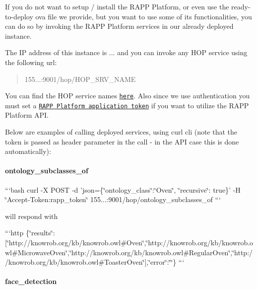 If you do not want to setup / install the R\-A\-P\-P Platform, or even use the ready-\/to-\/deploy ova file we provide, but you want to use some of its functionalities, you can do so by invoking the R\-A\-P\-P Platform services in our already deployed instance.

The I\-P address of this instance is {...} and you can invoke any H\-O\-P service using the following url\-:

\begin{quotation}
155...\-:9001/hop/\-H\-O\-P\-\_\-\-S\-R\-V\-\_\-\-N\-A\-M\-E

\end{quotation}


You can find the H\-O\-P service names \href{https://github.com/rapp-project/rapp-platform/wiki/RAPP-HOP-Web-services}{\tt here}. Also since we use authentication you must set a \href{https://github.com/rapp-project/rapp-api/tree/master/python#authenticationtokens}{\tt R\-A\-P\-P Platform application token} if you want to utilize the R\-A\-P\-P Platform A\-P\-I.

Below are examples of calling deployed services, using {\ttfamily curl} cli (note that the token is passed as header parameter in the call -\/ in the A\-P\-I case this is done automatically)\-:

\paragraph*{ontology\-\_\-subclasses\-\_\-of}

```bash curl -\/\-X P\-O\-S\-T -\/d 'json=\{\char`\"{}ontology\-\_\-class\char`\"{}\-:\char`\"{}\-Oven\char`\"{}, \char`\"{}recursive\char`\"{}\-: true\}' -\/\-H \char`\"{}\-Accept-\/\-Token\-:rapp\-\_\-token\char`\"{} 155...\-:9001/hop/ontology\-\_\-subclasses\-\_\-of ```

will respond with

```http \{\char`\"{}results\char`\"{}\-:\mbox{[}\char`\"{}http\-://knowrob.\-org/kb/knowrob.\-owl\#\-Oven\char`\"{},\char`\"{}http\-://knowrob.\-org/kb/knowrob.\-owl\#\-Microwave\-Oven\char`\"{},\char`\"{}http\-://knowrob.\-org/kb/knowrob.\-owl\#\-Regular\-Oven\char`\"{},\char`\"{}http\-://knowrob.\-org/kb/knowrob.\-owl\#\-Toaster\-Oven\char`\"{}\mbox{]},\char`\"{}error\char`\"{}\-:\char`\"{}\char`\"{}\} ```

\paragraph*{face\-\_\-detection}

